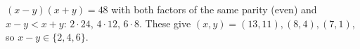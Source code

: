 $(x-y)(x+y)=48$ with both factors of the same parity (even) and $x-y<x+y$: $2\cdot24$, $4\cdot12$, $6\cdot8$. These give $(x,y)=(13,11),(8,4),(7,1)$, so $x-y\in\boxed{\{2,4,6\}}$.
